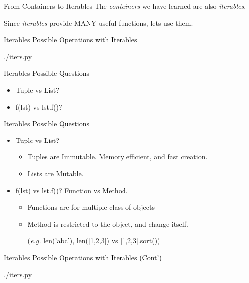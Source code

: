 \documentclass{beamer}
\begin{document}
\begin{frame}{From Containers to Iterables}
  The \textit{containers} we have learned are also \textit{iterables}.

  Since \textit{iterables} provide MANY useful functions, lets use them.
\end{frame}


\begin{frame}{Iterables}
  \textcolor{black}{\large{Possible Operations with Iterables}}
  \begin{lstinputlisting}[firstline=1, lastline=16]
    {./iters.py}
  \end{lstinputlisting}
\end{frame}

\begin{frame}{Iterables}
  \textcolor{black}{\large{Possible Questions}}
  \begin{itemize}
    \item Tuple vs List?
    \item f(lst) vs lst.f()?
  \end{itemize}
\end{frame}

\begin{frame}{Iterables}
  \textcolor{black}{\large{Possible Questions}}
  \begin{itemize}
    \item Tuple vs List?
      \begin{itemize}
        \item Tuples are Immutable. Memory efficient, and fast creation.
        \item Lists are Mutable.
      \end{itemize}

    \item f(lst) vs lst.f()?
      Function vs Method. 
      \begin{itemize}
        \item Functions are for multiple class of objects
        \item Method is restricted to the object, and change itself. 
          
          (\textit{e.g.} len('abc'), len([1,2,3]) vs [1,2,3].sort())
      \end{itemize}
  \end{itemize}
\end{frame}

\begin{frame}{Iterables}
  \textcolor{black}{\large{Possible Operations with Iterables (Cont')}}
  \begin{lstinputlisting}[firstline=19, lastline=31]
    {./iters.py}
  \end{lstinputlisting}
\end{frame}
\end{document}
